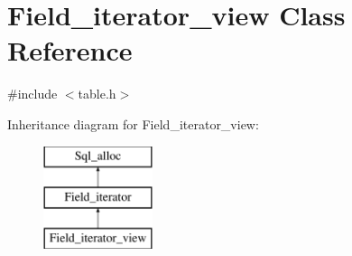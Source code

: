 \hypertarget{classField__iterator__view}{}\section{Field\+\_\+iterator\+\_\+view Class Reference}
\label{classField__iterator__view}


{\ttfamily \#include $<$table.\+h$>$}

Inheritance diagram for Field\+\_\+iterator\+\_\+view\+:\begin{figure}[H]
\begin{center}
\leavevmode
\includegraphics[height=3.000000cm]{classField__iterator__view}
\end{center}
\end{figure}
